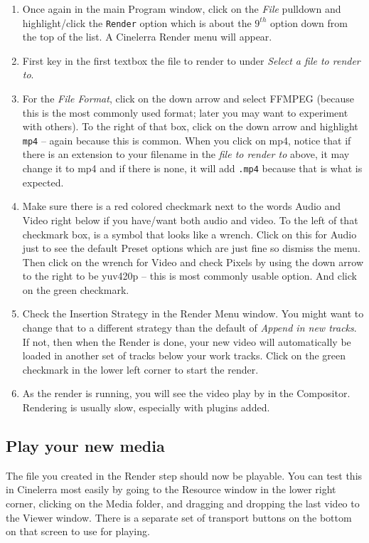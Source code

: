 \begin{enumerate}
	\item Once again in the main Program window, click on the \textit{File} pulldown and highlight/click the \texttt{Render}
	option which is about the $9^{th}$ option down from the top of the list.  A Cinelerra Render menu will
	appear.
	\item First key in the first textbox the file to render to under \textit{Select a file to render to}.
	\item For the \textit{File Format}, click on the down arrow and select FFMPEG (because this is the most
	commonly used format; later you may want to experiment with others).  To the right of that box,
	click on the down arrow and highlight \texttt{mp4} -- again because this is common.  When you click on 
	mp4, notice that if there is an extension to your filename in the \textit{file to render to} above, it may
	change it to mp4 and if there is none, it will add \texttt{.mp4} because that is what is expected.
	\item Make sure there is a red colored checkmark next to the words Audio and Video right below if you
	have/want both audio and video.  To the left of that checkmark box, is a symbol that looks like a
	wrench.  Click on this for Audio just to see the default Preset options which are just fine so dismiss
	the menu.  Then click on the wrench for Video and check Pixels by using the down arrow to the
	right to be yuv420p -- this is most commonly usable option.  And click on the green checkmark.
	\item Check the Insertion Strategy in the Render Menu window.  You might want to change that to
	a different strategy than the default of \textit{Append in new tracks}.  If not, then when the Render is done,
	your new video will automatically be loaded in another set of tracks below your work tracks.  Click
	on the green checkmark in the lower left corner to start the render.
	\item As the render is running, you will see the video play by in the Compositor.  Rendering is usually
	slow, especially with plugins added.
\end{enumerate}

\subsection{Play your new media}%
\label{sub:play_your_new_media}

The file you created in the Render step should now be playable.  You can test this in Cinelerra most easily by going to the Resource window in the lower right corner, clicking on the Media folder, and dragging and dropping the last video to the Viewer window.  There is a separate set of transport buttons on the bottom on that screen to use for playing.

